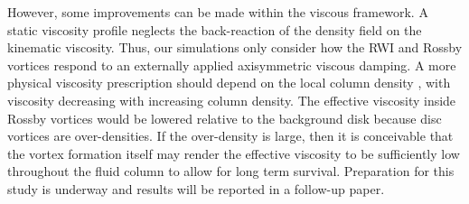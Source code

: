 However, some improvements can be made within the viscous
framework. A static viscosity profile neglects the
back-reaction of the density field on the kinematic viscosity. Thus,
our simulations only consider how the RWI and Rossby vortices
respond to an externally applied axisymmetric viscous damping. A more
physical viscosity prescription should depend on the local column density
\citep{fleming03}, with viscosity decreasing with increasing column
density. The effective viscosity inside Rossby vortices would be
lowered relative to the background disk because disc vortices are
over-densities. If the over-density is large, then it is
conceivable that the vortex formation itself may render the effective
viscosity to be sufficiently low throughout the fluid column to allow
for long term survival.  
Preparation for this study is underway and results will be reported in
a follow-up paper. 



